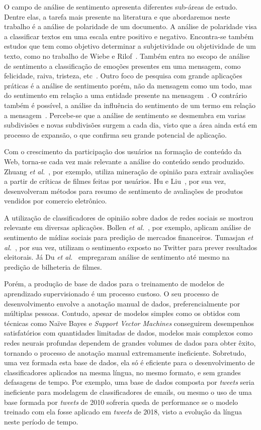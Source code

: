 O campo de análise de sentimento apresenta diferentes sub-áreas de estudo.
Dentre elas, a tarefa mais presente na literatura e que abordaremos neste trabalho é a análise de polaridade de um
documento.
A análise de polaridade visa a classificar textos em uma escala entre positivo e negativo.
Encontra-se também estudos que tem como objetivo determinar a subjetividade ou objetividade de um texto, como no
trabalho de Wiebe e Rilof~\cite{Wiebe05}.
Também entra no escopo de análise de sentimento a classificação de emoções presentes em uma mensagem, como felicidade,
raiva, tristeza, etc~\cite{bollen11b}.
Outro foco de pesquisa com grande aplicações práticas é a análise de sentimento porém, não da mensagem como um todo, mas
do sentimento em relação a uma entidade presente na mensagem~\cite{eirinaki12}.
O contrário também é possível, a análise da influência do sentimento de um termo em relação a mensagem~\cite{socher13}.
Percebe-se que a análise de sentimento se desmembra em varias subdivisões e novas subdivisões surgem a cada dia, visto
que a área ainda está em processo de expansão, o que confirma seu grande potencial de aplicação.

Com o crescimento da participação dos usuários na formação de conteúdo da Web, torna-se cada vez mais relevante a análise
do conteúdo sendo produzido.
Zhuang \textit{et al.}~\cite{zhuang06}, por exemplo, utiliza mineração de opinião para extrair avaliações a partir de
críticas de filmes feitas por usuários.
Hu e Liu~\cite{hu04}, por sua vez, desenvolveram métodos para resumo de sentimento de avaliações de produtos vendidos
por comercio eletrônico.

A utilização de classificadores de opinião sobre dados de redes sociais se mostrou relevante em diversas aplicações.
Bollen \textit{et al.}~\cite{bollen11}, por exemplo, aplicam análise de sentimento de mídias sociais para predição de
mercados financeiros.
Tumasjan \textit{et al.}~\cite{tumasjan10}, por sua vez, utilizam o sentimento exposto no Twitter para prever resultados
eleitorais.
Já Du \textit{et al.}~\cite{du14} empregaram análise de sentimento até mesmo na predição de bilheteria de filmes.

Porém, a produção de base de dados para o treinamento de modelos de aprendizado supervisionado é um processo custoso.
O seu processo de desenvolvimento envolve a anotação manual de dados, preferencialmente por múltiplas pessoas.
Contudo, apesar de modelos simples como os obtidos com técnicas como Naïve Bayes e \textit{Support Vector Machines}
conseguirem desempenhos satisfatórios com quantidades limitadas de dados, modelos mais complexos como redes neurais
profundas dependem de grandes volumes de dados para obter êxito, tornando o processo de anotação manual extremamente
ineficiente.
Sobretudo, uma vez formada esta base de dados, ela só é eficiente para o desenvolvimento de classificadores aplicados
na mesma língua, no mesmo formato, e sem grandes defasagens de tempo.
Por exemplo, uma base de dados composta por \textit{tweets} seria ineficiente para modelagem de classificadores de
emails, ou mesmo o uso de uma base formada por \textit{tweets} de 2010 sofreria queda de performance se o modelo
treinado com ela fosse aplicado em \textit{tweets} de 2018, visto a evolução da língua neste período de tempo.

